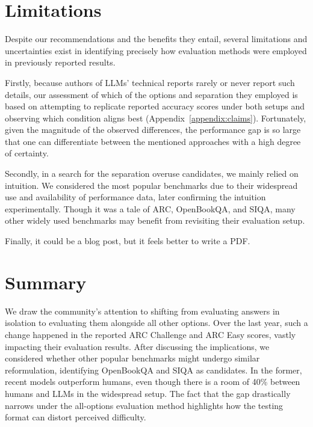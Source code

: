 \documentclass[11pt]{article}
\DeclareRobustCommand{\shl}[3]{
  \begingroup\setlength{\fboxsep}{2pt}%
  \colorbox{#1}{{\hspace*{2pt}\vphantom{Ay}#2\hspace*{2pt}}}%
  \endgroup
}
\begin{document}


\section*{Limitations}
Despite our recommendations and the benefits they entail, several limitations and uncertainties exist in identifying precisely how evaluation methods were employed in previously reported results.

Firstly, because authors of LLMs' technical reports rarely or never report such details, our assessment of which of the \shl{all}{options}{} and \shl{separation}{separation}{} they employed is based on attempting to replicate reported accuracy scores under both setups and observing which condition aligns best (Appendix~\ref{appendix:claims}). Fortunately, given the magnitude of the observed differences, the performance gap is so large that one can differentiate between the mentioned approaches with a high degree of certainty.

Secondly, in a search for the \shl{separation}{separation}{} overuse candidates, we mainly relied on intuition. We considered the most popular benchmarks due to their widespread use and availability of performance data, later confirming the intuition experimentally. Though it was a tale of ARC, OpenBookQA, and SIQA, many other widely used benchmarks may benefit from revisiting their evaluation setup.

Finally, it could be a blog post, but it feels better to write a PDF.

\section{Summary}

We draw the community's attention to shifting from evaluating answers in isolation to evaluating them alongside all other options. Over the last year, such a change happened in the reported ARC Challenge and ARC Easy scores, vastly impacting their evaluation results. After discussing the implications, we considered whether other popular benchmarks might undergo similar reformulation, identifying OpenBookQA and SIQA as candidates. In the former, recent models outperform humans, even though there is a room of 40\% between humans and LLMs in the widespread setup. The fact that the gap drastically narrows under the all-options evaluation method highlights how the testing format can distort perceived difficulty.
\end{document}
